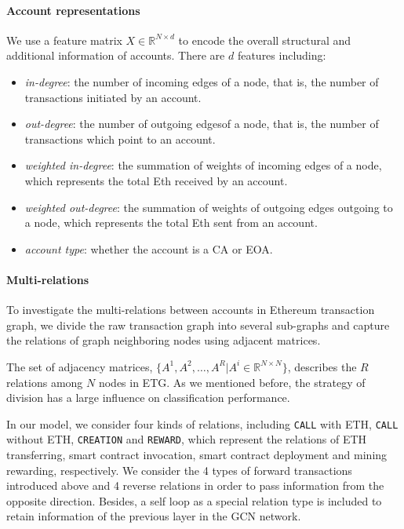 \paragraph{Account representations} We use a feature matrix $X \in \mathbb{R}^{N \times d}$ to encode the overall structural and additional information of accounts. There are $d$ features including:
\begin{itemize}
	\item \emph{in-degree}: the number of incoming edges of a node, that is, the number of transactions initiated by an account.
	\item \emph{out-degree}: the number of outgoing edgesof a node, that is, the number of transactions which point to an account.
	\item \emph{weighted in-degree}: the summation of weights of incoming edges of a node, which represents the total Eth received by an account.
	\item \emph{weighted out-degree}: the summation of weights of outgoing edges outgoing to a node, which represents the total Eth sent from an account.
	\item \emph{account type}: whether the account is a CA or EOA.
\end{itemize}

\paragraph{Multi-relations} To investigate the multi-relations between accounts in Ethereum transaction graph, we divide the raw transaction graph into several sub-graphs and capture the relations of graph neighboring nodes using adjacent matrices.

The set of adjacency matrices, $\{A^1,A^2,\dots,A^R|A^i\in \mathbb{R}^{N \times N}\}$, describes the $R$ relations among $N$ nodes in ETG. As we mentioned before, the strategy of division has a large influence on classification performance.

In our model, we consider four kinds of relations, including \texttt{CALL} with ETH, \texttt{CALL} without ETH, \texttt{CREATION} and \texttt{REWARD}, which represent the relations of ETH transferring, smart contract invocation, smart contract deployment and mining rewarding, respectively. We consider the 4 types of forward transactions introduced above and 4 reverse relations in order to pass information from the opposite direction. Besides, a self loop as a special relation type is included to retain information of the previous layer in the GCN network.

